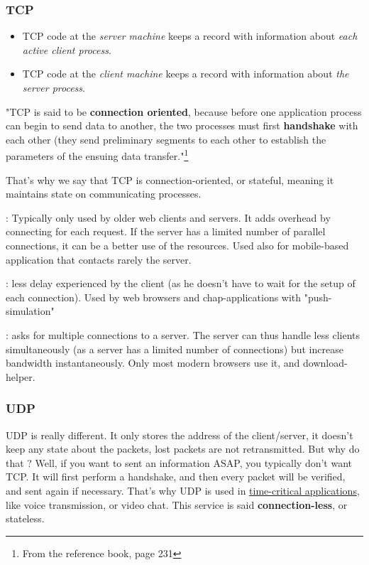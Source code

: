 \documentclass[12pt,a4paper]{article}
\begin{document}
\subsubsection{TCP}
\begin{itemize}
	\item 	TCP code at the \textit{server machine} keeps a record with information about \textit{each active client process}.
	\item 	TCP code at the \textit{client machine} keeps a record with information about \textit{the server process}. 
\end{itemize}

"TCP is said to be \textbf{connection oriented}, because before one application process can begin to send data to another, the two processes must first \textbf{handshake} with each other (they send preliminary segments to each other to establish the parameters of the ensuing data transfer."\footnote{From the reference book, page 231} 

That's why we say that TCP is connection-oriented, or stateful, meaning it maintains state on communicating processes.

 : Typically only used by older web clients and servers. It adds overhead by connecting for each request. If the server has a limited number of parallel connections, it can be a better use of the resources. Used also for mobile-based application that contacts rarely the server.

 : less delay experienced by the client (as he doesn't have to wait for the setup of each connection). Used by web browsers and chap-applications with "push-simulation" 

 : asks for multiple connections to a server. The server can thus handle less clients simultaneously (as a server has a limited number of connections) but increase bandwidth instantaneously. Only most modern browsers use it, and download-helper.
\subsubsection{UDP}
UDP is really different. It only stores the address of the client/server, it doesn't keep any state about the packets, lost packets are not retransmitted. But why do that ? Well, if you want to sent an information ASAP, you typically don't want TCP. It will first perform a handshake, and then every packet will be verified, and sent again if necessary. That's why UDP is used in \uline{time-critical applications}, like voice transmission, or video chat. This service is said \textbf{connection-less}, or stateless.
\end{document}
